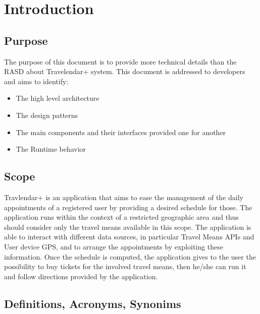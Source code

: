 \chapter{Introduction}

\section{Purpose}
The purpose of this document is to provide more technical details than the RASD about Travelendar+ system. This document is addressed to developers and aims to identify:
\begin{itemize}
\item The high level architecture
\item The design patterns
\item The main components and their interfaces provided one for another
\item The Runtime behavior
\end{itemize}

\section{Scope}

Travlendar+ is an application that aims to ease the management of the daily appointments of a registered user by providing a desired schedule for those. 
The application runs within the context of a restricted geographic area and thus should consider only the travel means available in this scope.
The application is able to interact with different data sources, in particular Travel Means APIs and User device GPS, and to arrange the appointments by exploiting these information.
Once the schedule is computed, the application gives to the user the possibility to buy tickets for the involved travel means, then he/she can run it and follow directions provided by the application. 

\section{Definitions, Acronyms, Synonims}



